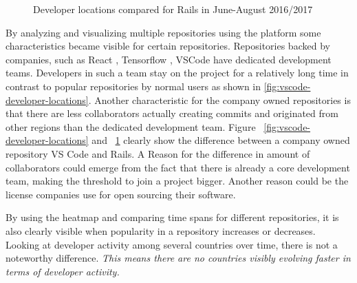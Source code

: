 \documentclass[acmtog, authorversion]{acmart}
\begin{document}
\begin{figure}
\caption{Developer locations compared for Rails in June-August 2016/2017}
\label{fig:rails-developer-locations}
\end{figure}

By analyzing and visualizing multiple repositories using the platform some characteristics became visible for certain repositories.
Repositories backed by companies, such as React \cite{React}, Tensorflow  \cite{TensorFlow}, VSCode \cite{VSCode} have dedicated development teams.
Developers in such a team stay on the project for a relatively long time in contrast to popular repositories by normal users as shown in \ref{fig:vscode-developer-locations}.
Another characteristic for the company owned repositories is that there are less collaborators actually creating commits and originated from other regions than the dedicated development team.
Figure ~\ref{fig:vscode-developer-locations} and ~\ref{fig:rails-developer-locations} clearly show the difference between a company owned repository VS Code and Rails.
A Reason for the difference in amount of collaborators could emerge from the fact that there is already a core development team, making the threshold to join a project bigger.
Another reason could be the license companies use for open sourcing their software.

By using the heatmap and comparing time spans for different repositories, it is also clearly visible when popularity in a repository increases or decreases.
Looking at developer activity among several countries over time, there is not a noteworthy difference.
\textit{This means there are no countries visibly evolving faster in terms of developer activity.}
\end{document}
